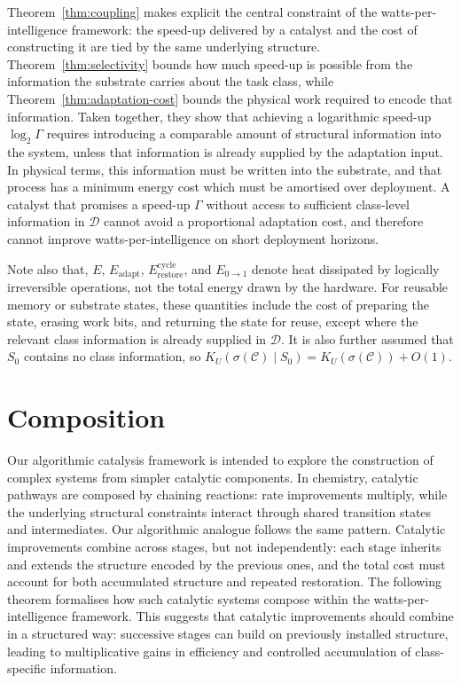 \documentclass[runningheads]{llncs}
\newcommand{\Class}{\mathcal{C}}
\newcommand{\Erestore}{E_{\mathrm{restore}}^{\mathrm{cycle}}}
\newcommand{\Eadapt}{E_{\mathrm{adapt}}}
\begin{document}
Theorem~\ref{thm:coupling} makes explicit the central constraint of
the watts-per-intelligence framework: the speed-up delivered by a
catalyst and the cost of constructing it are tied by the same
underlying structure. Theorem~\ref{thm:selectivity} bounds how much
speed-up is possible from the information the substrate carries
about the task class, while Theorem~\ref{thm:adaptation-cost}
bounds the physical work required to encode that information.
Taken together, they show that achieving a logarithmic speed-up
$\log_2\Gamma$ requires introducing a comparable amount of
structural information into the system, unless that information is
already supplied by the adaptation input. In physical terms, this
information must be written into the substrate, and that process
has a minimum energy cost which must be amortised over deployment.
A catalyst that promises a speed-up $\Gamma$ without access to
sufficient class-level information in $\mathcal{D}$ cannot avoid a
proportional adaptation cost, and therefore cannot improve
watts-per-intelligence on short deployment horizons. 

Note also that, $E$, $\Eadapt$, $\Erestore$, and $E_{0\to 1}$ denote heat dissipated by logically irreversible operations, not the total energy drawn by the hardware. For reusable memory or substrate states, these quantities include the cost of preparing the state, erasing work bits, and returning the state for reuse, except where the relevant class information is already supplied in \(\mathcal{D}\). It is also further assumed that \(S_0\) contains no class information, so \(K_U(\sigma(\Class)\mid S_0)=K_U(\sigma(\Class))+O(1)\).

\section{Composition}
\label{sec:composition}
Our algorithmic catalysis framework is intended to explore the construction of complex
systems from simpler catalytic components. In chemistry, catalytic
pathways are composed by chaining reactions: rate improvements
multiply, while the underlying structural constraints interact
through shared transition states and intermediates. Our algorithmic
analogue follows the same pattern. Catalytic improvements combine
across stages, but not independently: each stage inherits and
extends the structure encoded by the previous ones, and the total
cost must account for both accumulated structure and repeated
restoration. The following theorem formalises how such catalytic
systems compose within the watts-per-intelligence framework. This suggests that catalytic improvements should combine in a
structured way: successive stages can build on previously installed
structure, leading to multiplicative gains in efficiency and
controlled accumulation of class-specific information. 
\end{document}
